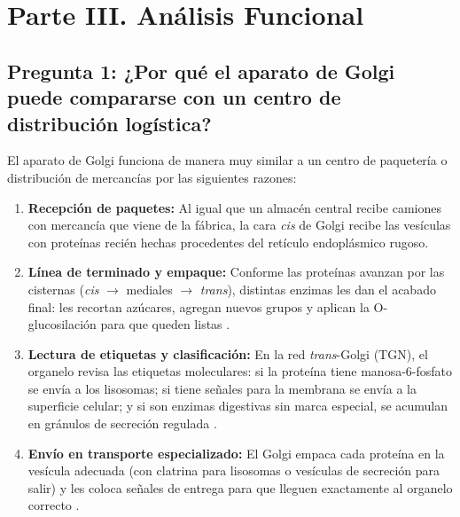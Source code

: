 \documentclass[spanish,letterpaper,oneside]{article}
\begin{document}
\section{Parte III. Análisis Funcional}

\subsection{Pregunta 1: ¿Por qué el aparato de Golgi puede compararse con un centro de distribución logística?}
El aparato de Golgi funciona de manera muy similar a un centro de paquetería o distribución de mercancías por las siguientes razones:
\begin{enumerate}
    \item \textbf{Recepción de paquetes:} Al igual que un almacén central recibe camiones con mercancía que viene de la fábrica, la cara \textit{cis} de Golgi recibe las vesículas con proteínas recién hechas procedentes del retículo endoplásmico rugoso.
    \item \textbf{Línea de terminado y empaque:} Conforme las proteínas avanzan por las cisternas (\textit{cis} $\to$ mediales $\to$ \textit{trans}), distintas enzimas les dan el acabado final: les recortan azúcares, agregan nuevos grupos y aplican la O-glucosilación para que queden listas \parencite{mathews2013bioquimica, fortoul2020histologia}.
    \item \textbf{Lectura de etiquetas y clasificación:} En la red \textit{trans}-Golgi (TGN), el organelo revisa las etiquetas moleculares: si la proteína tiene manosa-6-fosfato se envía a los lisosomas; si tiene señales para la membrana se envía a la superficie celular; y si son enzimas digestivas sin marca especial, se acumulan en gránulos de secreción regulada \parencite{alberts2022molecular, lodish2021molecular}.
    \item \textbf{Envío en transporte especializado:} El Golgi empaca cada proteína en la vesícula adecuada (con clatrina para lisosomas o vesículas de secreción para salir) y les coloca señales de entrega para que lleguen exactamente al organelo correcto \parencite{karp2019biologia}.
\end{enumerate}
\end{document}
